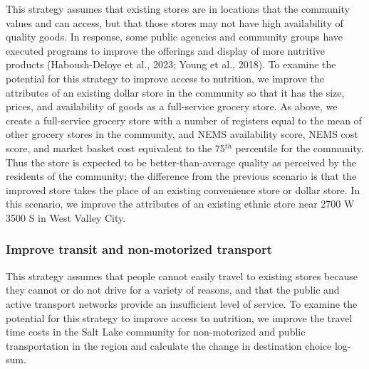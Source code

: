 \documentclass[
  letterpaper,
  number,
  review,
  3p]{elsarticle}
\begin{document}
This strategy assumes that existing stores are in locations that the
community values and can access, but that those stores may not have high
availability of quality goods. In response, some public agencies and
community groups have executed programs to improve the offerings and
display of more nutritive products (Haboush-Deloye et al., 2023; Young
et al., 2018). To examine the potential for this strategy to improve
access to nutrition, we improve the attributes of an existing dollar
store in the community so that it has the size, prices, and availability
of goods as a full-service grocery store. As above, we create a
full-service grocery store with a number of registers equal to the mean
of other grocery stores in the community, and NEMS availability score,
NEMS cost score, and market basket cost equivalent to the 75\(^{th}\)
percentile for the community. Thus the store is expected to be
better-than-average quality as perceived by the residents of the
community; the difference from the previous scenario is that the
improved store takes the place of an existing convenience store or
dollar store. In this scenario, we improve the attributes of an existing
ethnic store near 2700 W 3500 S in West Valley City.

\subsubsection{Improve transit and non-motorized
transport}\label{improve-transit-and-non-motorized-transport}

This strategy assumes that people cannot easily travel to existing
stores because they cannot or do not drive for a variety of reasons, and
that the public and active transport networks provide an insufficient
level of service. To examine the potential for this strategy to improve
access to nutrition, we improve the travel time costs in the Salt Lake
community for non-motorized and public transportation in the region and
calculate the change in destination choice log-sum.
\end{document}
